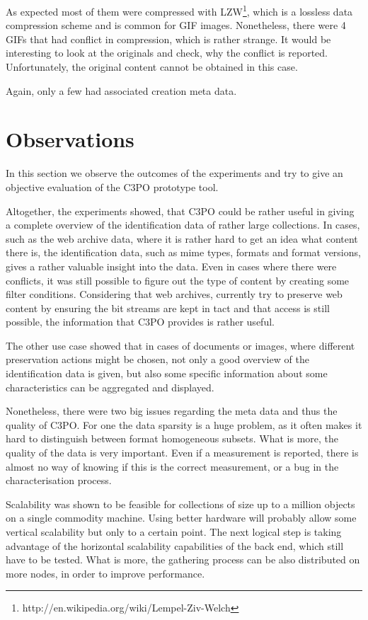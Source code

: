 As expected most of them were compressed with LZW\footnote{http://en.wikipedia.org/wiki/Lempel-Ziv-Welch}, which is a lossless data compression scheme and is common for GIF images. Nonetheless, there were 4 GIFs that had conflict in compression, which is rather strange. It would be interesting to look at the originals and check, why the conflict is reported. Unfortunately, the original content cannot be obtained in this case.

Again, only a few had associated creation meta data.

\section{Observations}
In this section we observe the outcomes of the experiments and try to give an objective evaluation of the C3PO prototype tool.

Altogether, the experiments showed, that C3PO could be rather useful in giving a complete overview of the identification data of rather large collections. In cases, such as the web archive data, where it is rather hard to get an idea what content there is, the identification data, such as mime types, formats and format versions, gives a rather valuable insight into the data. Even in cases where there were conflicts, it was still possible to figure out the type of content by creating some filter conditions. Considering that web archives, currently try to preserve web content by ensuring the bit streams are kept in tact and that access is still possible, the information that C3PO provides is rather useful. 

The other use case showed that in cases of documents or images, where different preservation actions might be chosen, not only a good overview of the identification data is given, but also some specific information about some characteristics can be aggregated and displayed.

Nonetheless, there were two big issues regarding the meta data and thus the quality of C3PO. For one the data sparsity is a huge problem, as it often makes it hard to distinguish between format homogeneous subsets. What is more, the quality of the data is very important. Even if a measurement is reported, there is almost no way of knowing if this is the correct measurement, or a bug in the characterisation process.

Scalability was shown to be feasible for collections of size up to a million objects on a single commodity machine. Using  better hardware will probably allow some vertical scalability but only to a certain point. The next logical step is taking advantage of the horizontal scalability capabilities of the back end, which still have to be tested. What is more, the gathering process can be also distributed on more nodes, in order to improve performance.


